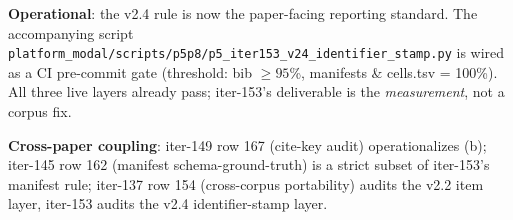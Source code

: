 \textbf{Operational}: the v2.4 rule is now the paper-facing reporting
standard. The accompanying script
\texttt{platform_modal/scripts/p5p8/p5\_iter153\_v24\_identifier\_stamp.py} is
wired as a CI pre-commit gate (threshold: bib $\geq 95$\%, manifests
\& cells.tsv = 100\%). All three live layers already pass; iter-153's
deliverable is the \emph{measurement}, not a corpus fix.

\textbf{Cross-paper coupling}: iter-149 row 167 (cite-key audit)
operationalizes (b); iter-145 row 162 (manifest schema-ground-truth)
is a strict subset of iter-153's manifest rule; iter-137 row 154
(cross-corpus portability) audits the v2.2 item layer, iter-153
audits the v2.4 identifier-stamp layer.
